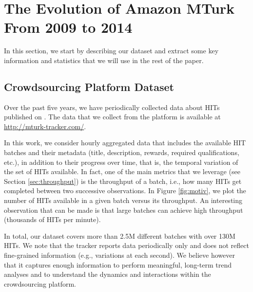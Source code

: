 \section{The Evolution of Amazon MTurk From 2009 to 2014}
\label{sec:stats}

In this section, we start by describing our dataset and extract some key information and statistics that we will use in the rest of the paper.

\subsection{Crowdsourcing Platform Dataset}
\label{sec:tracker}
Over the past five years, we have periodically collected data about HITs published on \amt{}.
The data that we collect from the platform is available at \url{http://mturk-tracker.com/}. 

In this work, we consider hourly aggregated data that includes the available HIT batches and their metadata (title, description, rewards, required qualifications, etc.), in addition to their progress over time, that is, the temporal variation of the set of HITs available. In fact, one of the main metrics that we leverage (see Section \ref{sec:throughput}) is the throughput of a batch, i.e., how many HITs get completed between two successive observations. In Figure \ref{fig:motiv}, we plot the number of HITs available in a given batch versus its throughput. An interesting observation that can be made is that large batches can achieve high throughput (thousands of HITs per minute).

In total, our dataset covers more than 2.5M different batches with over 130M HITs.
We note that the tracker reports data periodically only and does not reflect fine-grained information (e.g., variations at each second). We believe however that it captures enough information to perform meaningful, long-term trend analyses and to understand the dynamics and interactions within the crowdsourcing platform.\\


